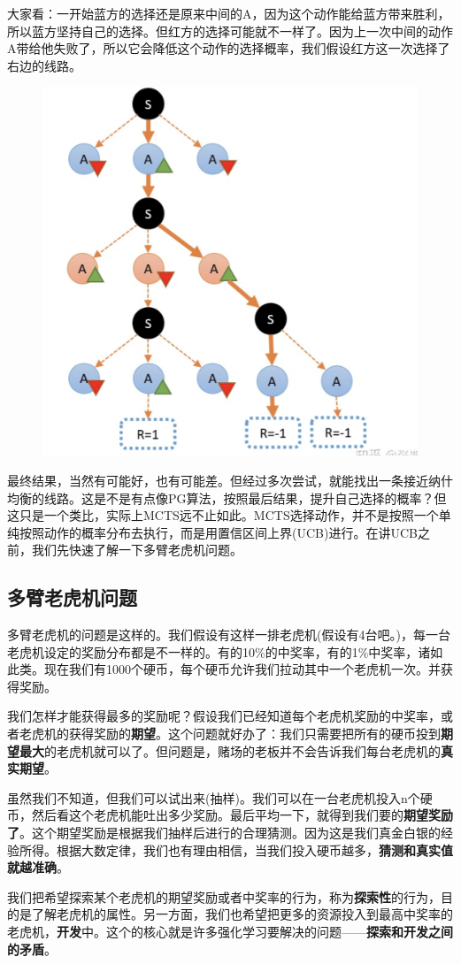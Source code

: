 \documentclass[12pt]{article}
\begin{document}
大家看：一开始蓝方的选择还是原来中间的A，因为这个动作能给蓝方带来胜利，所以蓝方坚持自己的选择。但红方的选择可能就不一样了。因为上一次中间的动作A带给他失败了，所以它会降低这个动作的选择概率，我们假设红方这一次选择了右边的线路。
\begin{figure}[H]
    \centering
    \includegraphics[width=.3\textwidth]{fig/ReinforcementLearning/AlphaZero_Markov_Tree_AB_Selection_Example_2.png}
\end{figure}

最终结果，当然有可能好，也有可能差。但经过多次尝试，就能找出一条接近纳什均衡的线路。这是不是有点像PG算法，按照最后结果，提升自己选择的概率？但这只是一个类比，实际上MCTS远不止如此。MCTS选择动作，并不是按照一个单纯按照动作的概率分布去执行，而是用置信区间上界(UCB)进行。在讲UCB之前，我们先快速了解一下多臂老虎机问题。

\subsection{多臂老虎机问题}
多臂老虎机的问题是这样的。我们假设有这样一排老虎机(假设有4台吧。)，每一台老虎机设定的奖励分布都是不一样的。有的10\%的中奖率，有的1\%中奖率，诸如此类。现在我们有1000个硬币，每个硬币允许我们拉动其中一个老虎机一次。并获得奖励。

我们怎样才能获得最多的奖励呢？假设我们已经知道每个老虎机奖励的中奖率，或者老虎机的获得奖励的\textbf{期望}。这个问题就好办了：我们只需要把所有的硬币投到\textbf{期望最大}的老虎机就可以了。但问题是，赌场的老板并不会告诉我们每台老虎机的\textbf{真实期望}。

虽然我们不知道，但我们可以试出来(抽样)。我们可以在一台老虎机投入n个硬币，然后看这个老虎机能吐出多少奖励。最后平均一下，就得到我们要的\textbf{期望奖励了}。这个期望奖励是根据我们抽样后进行的合理猜测。因为这是我们真金白银的经验所得。根据大数定律，我们也有理由相信，当我们投入硬币越多，\textbf{猜测和真实值就越准确}。

我们把希望探索某个老虎机的期望奖励或者中奖率的行为，称为\textbf{探索性}的行为，目的是了解老虎机的属性。另一方面，我们也希望把更多的资源投入到最高中奖率的老虎机，\textbf{开发}中。这个的核心就是许多强化学习要解决的问题——\textbf{探索和开发之间的矛盾}。
\end{document}
